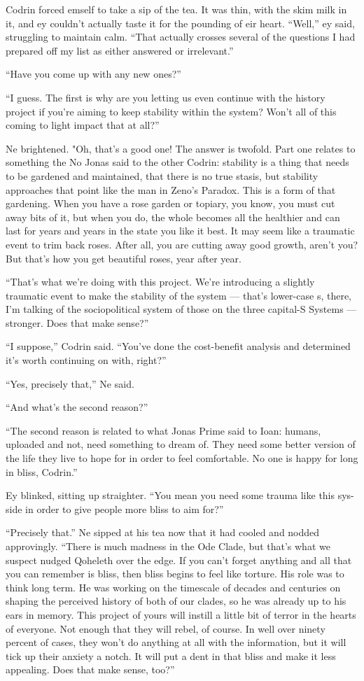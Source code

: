 Codrin forced emself to take a sip of the tea. It was thin, with the skim milk in it, and ey couldn't actually taste it for the pounding of eir heart. ``Well,'' ey said, struggling to maintain calm. ``That actually crosses several of the questions I had prepared off my list as either answered or irrelevant.''

``Have you come up with any new ones?''

``I guess. The first is why are you letting us even continue with the history project if you're aiming to keep stability within the system? Won't all of this coming to light impact that at all?''

Ne brightened. "Oh, that's a good one! The answer is twofold. Part one relates to something the No Jonas said to the other Codrin: stability is a thing that needs to be gardened and maintained, that there is no true stasis, but stability approaches that point like the man in Zeno's Paradox. This is a form of that gardening. When you have a rose garden or topiary, you know, you must cut away bits of it, but when you do, the whole becomes all the healthier and can last for years and years in the state you like it best. It may seem like a traumatic event to trim back roses. After all, you are cutting away good growth, aren't you? But that's how you get beautiful roses, year after year.

``That's what we're doing with this project. We're introducing a slightly traumatic event to make the stability of the system — that's lower-case s, there, I'm talking of the sociopolitical system of those on the three capital-S Systems — stronger. Does that make sense?''

``I suppose,'' Codrin said. ``You've done the cost-benefit analysis and determined it's worth continuing on with, right?''

``Yes, precisely that,'' Ne said.

``And what's the second reason?''

``The second reason is related to what Jonas Prime said to Ioan: humans, uploaded and not, need something to dream of. They need some better version of the life they live to hope for in order to feel comfortable. No one is happy for long in bliss, Codrin.''

Ey blinked, sitting up straighter. ``You mean you need some trauma like this sys-side in order to give people more bliss to aim for?''

``Precisely that.'' Ne sipped at his tea now that it had cooled and nodded approvingly. ``There is much madness in the Ode Clade, but that's what we suspect nudged Qoheleth over the edge. If you can't forget anything and all that you can remember is bliss, then bliss begins to feel like torture. His role was to think long term. He was working on the timescale of decades and centuries on shaping the perceived history of both of our clades, so he was already up to his ears in memory. This project of yours will instill a little bit of terror in the hearts of everyone. Not enough that they will rebel, of course. In well over ninety percent of cases, they won't do anything at all with the information, but it will tick up their anxiety a notch. It will put a dent in that bliss and make it less appealing. Does that make sense, too?''

